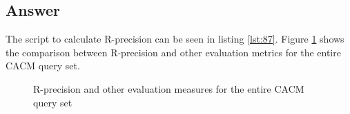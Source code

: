 \documentclass[letterpaper,11pt]{article}
\begin{document}
\subsection*{Answer}
The script to calculate R-precision can be seen in listing \ref{lst:87}. Figure \ref{fig:87_output} shows the comparison between R-precision and other evaluation metrics for the entire CACM query set. 

\begin{figure}[H]
	\centering
	\caption{R-precision and other evaluation measures for the entire CACM query set}
	\label{fig:87_output}
\end{figure}
\end{document}
